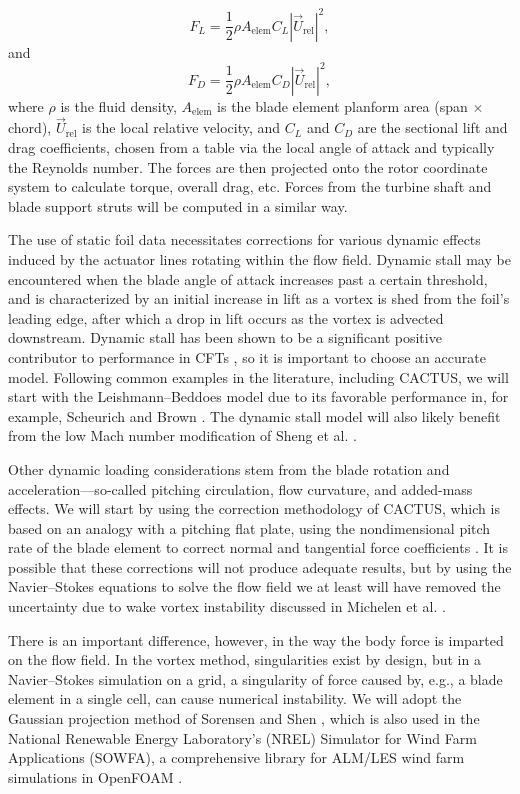\begin{equation}
F_L = \frac{1}{2} \rho A_\mathrm{elem} C_L |\vec{U}_\mathrm{rel}|^2,
\end{equation}
and
\begin{equation}
F_D = \frac{1}{2} \rho A_\mathrm{elem} C_D |\vec{U}_\mathrm{rel}|^2,
\end{equation}
where $\rho$ is the fluid density, $A_\mathrm{elem}$ is the blade element
planform area (span $\times$ chord), $\vec{U}_\mathrm{rel}$ is the local
relative velocity, and $C_L$ and $C_D$ are the sectional lift and drag
coefficients, chosen from a table via the local angle of attack and typically
the Reynolds number. The forces are then projected onto the rotor coordinate
system to calculate torque, overall drag, etc. Forces from the turbine shaft and
blade support struts will be computed in a similar way.

The use of static foil data necessitates corrections for various dynamic effects
induced by the actuator lines rotating within the flow field. Dynamic stall may
be encountered when the blade angle of attack increases past a certain
threshold, and is characterized by an initial increase in lift as a vortex is
shed from the foil's leading edge, after which a drop in lift occurs as the
vortex is advected downstream. Dynamic stall has been shown to be a significant
positive contributor to performance in CFTs \cite{Para2002, Urbina2013}, so it
is important to choose an accurate model. Following common examples in the
literature, including CACTUS, we will start with the Leishmann--Beddoes model
due to its favorable performance in, for example, Scheurich and Brown
\cite{Scheurich2011}. The dynamic stall model will also likely benefit from the
low Mach number modification of Sheng et al. \cite{Sheng2008}.

Other dynamic loading considerations stem from the blade rotation and
acceleration---so-called pitching circulation, flow curvature, and added-mass
effects. We will start by using the correction methodology of CACTUS, which is
based on an analogy with a pitching flat plate, using the nondimensional pitch
rate of the blade element to correct normal and tangential force coefficients
\cite{Murray2011}. It is possible that these corrections will not produce
adequate results, but by using the Navier--Stokes equations to solve the flow
field we at least will have removed the uncertainty due to wake vortex
instability discussed in Michelen et al. \cite{Michelen2014}.

There is an important difference, however, in the way the body force is imparted
on the flow field. In the vortex method, singularities exist by design, but in a
Navier--Stokes simulation on a grid, a singularity of force caused by, e.g., a
blade element in a single cell, can cause numerical instability. We will adopt
the Gaussian projection method of Sorensen and Shen \cite{Sorensen2002}, which
is also used in the National Renewable Energy Laboratory's (NREL) Simulator for
Wind Farm Applications (SOWFA), a comprehensive library for ALM/LES wind farm
simulations in OpenFOAM \cite{Churchfield2013}.

